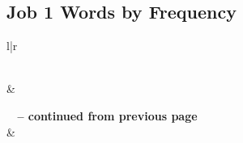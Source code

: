 

\subsection{Job 1 Words by Frequency}


\normalsize
 
\begin{center}
\begin{longtable}{l|r}
\caption[Job 1 Words by Frequency]{Job 1 Words by Frequency}\label{table:WordsbyFrequency for Job 1} \\
\hline {} &  \\ \hline 
\endfirsthead
 
{{\bfseries \tablename\ \thetable{} -- continued from previous page}} \\  
\hline {} &  \\ \hline 
\endhead
 

\end{longtable}
\end{center}
